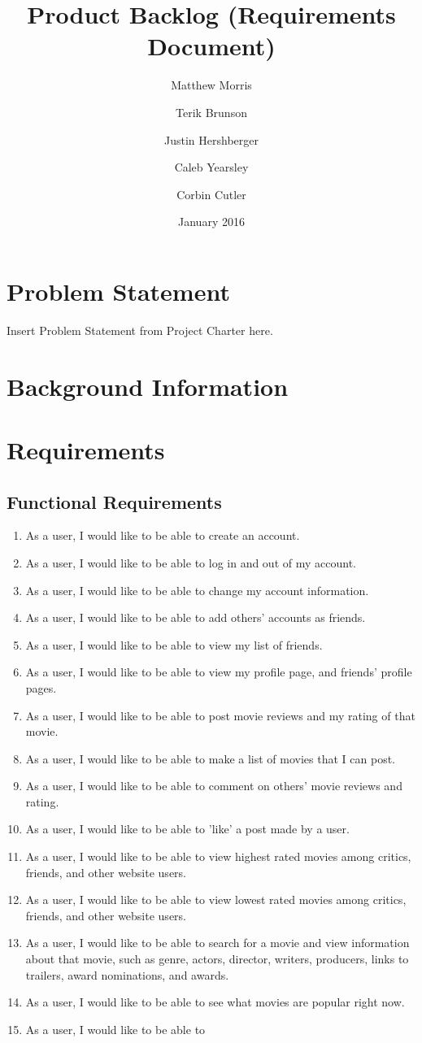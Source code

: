 \documentclass{article}
\title{Product Backlog (Requirements Document)}
\date{January 2016}
\author{Matthew Morris \and Terik Brunson \and Justin Hershberger \and Caleb Yearsley \and Corbin Cutler}
\begin{document}
\maketitle

\section{Problem Statement}
Insert Problem Statement from Project Charter here.

\section{Background Information}

\section{Requirements}

\subsection{Functional Requirements}
\begin{enumerate}
    \item As a user, I would like to be able to create an account.
    \item As a user, I would like to be able to log in and out of my account.
    \item As a user, I would like to be able to change my account information.
    \item As a user, I would like to be able to add others' accounts as friends.
    \item As a user, I would like to be able to view my list of friends.
    \item As a user, I would like to be able to view my profile page, and friends' profile pages.
    \item As a user, I would like to be able to post movie reviews and my rating of that movie.
    \item As a user, I would like to be able to make a list of movies that I can post.
    \item As a user, I would like to be able to comment on others' movie reviews and rating.
    \item As a user, I would like to be able to 'like' a post made by a user.
    \item As a user, I would like to be able to view highest rated movies among critics, friends, and other website users.
    \item As a user, I would like to be able to view lowest rated movies among critics, friends, and other website users.
    \item As a user, I would like to be able to search for a movie and view information about that movie, such as genre, actors, director, writers, producers, links to trailers, award nominations, and awards.
    \item As a user, I would like to be able to see what movies are popular right now.
    \item As a user, I would like to be able to 
\end{enumerate}
\end{document}
